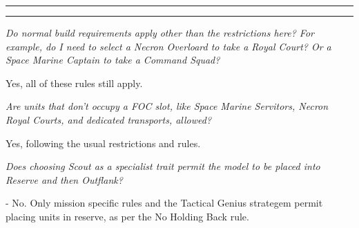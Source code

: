 \hrule
\smallskip
\hrule

\bigskip
%

\begin{multicols}{2}





%

\smallskip\noindent\emph{Do normal build requirements apply other than
  the restrictions here? For example, do I need to select a Necron
  Overloard to take a Royal Court?  Or a Space Marine Captain to take
  a Command Squad?}

Yes, all of these rules still apply.


\smallskip\noindent\emph{Are units that don't occupy a FOC slot, like
  Space Marine Servitors, Necron Royal Courts, and dedicated
  transports, allowed?}

Yes, following the usual restrictions and rules.


\bigskip{}%

\smallskip\noindent\emph{Does choosing Scout as a specialist trait
  permit the model to be placed into Reserve and then Outflank?}

- No.  Only mission specific rules and the Tactical Genius strategem
  permit placing units in reserve, as per the No Holding Back rule.


\end{multicols}
